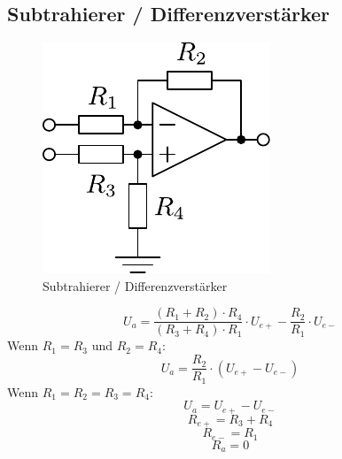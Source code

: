 



\subsection{Subtrahierer / Differenzverstärker}
\begin{figure}[h!]
	\centering
	\includegraphics[scale=\schscale]{op_sub.pdf}
	\caption{Subtrahierer / Differenzverstärker}
	\label{sch:op-sub}
\end{figure}
\[ U_a = \frac{(R_1 + R_2) \cdot R_4}{(R_3 + R_4) \cdot R_1} \cdot U_{e+} 
- \frac{R_2}{R_1} \cdot U_{e-} \]
Wenn $R_1 = R_3$ und $R_2 = R_4$: 
\[ U_a = \frac{R_2}{R_1} \cdot (U_{e+} - U_{e-}) \]
Wenn $R_1 = R_2 = R_3 = R_4$: 
\[ U_a = U_{e+} - U_{e-} \]
\[ R_{e+} = R_3 + R_4 \]
\[ R_{e-} = R_1 \]
\[ R_a = 0 \]